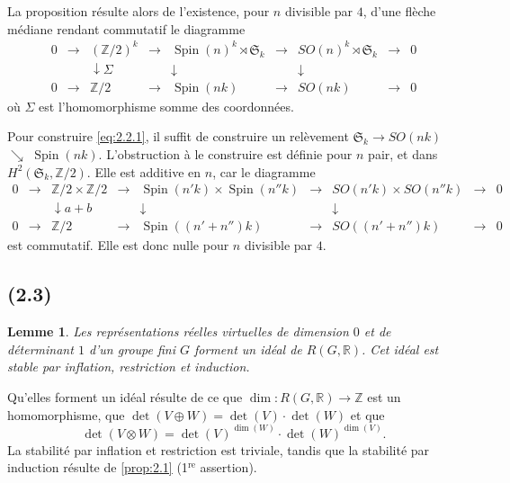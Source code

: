 \documentclass[11pt]{amsart}
\theoremstyle{plain}
\newtheorem{lemme}[theoreme]{Lemme}
\theoremstyle{definition}
\DeclareMathOperator{\Spin}{Spin}
\newcommand{\R}{\mathbb{R}}
\newcommand{\Z}{\mathbb{Z}}
\begin{document}
La proposition r\'esulte alors de l'existence, pour $n$ divisible par $4$, d'une fl\`eche m\'ediane rendant commutatif le diagramme
\begin{equation}\label{eq:2.2.1}
\begin{array}{ccccccccc}
0 & \longrightarrow & (\Z/2)^k & \longrightarrow & \Spin(n)^k\rtimes\mathfrak{S}_k & \longrightarrow & SO(n)^k\rtimes\mathfrak{S}_k & \longrightarrow & 0 \\
  &               & \downarrow{\scriptstyle\Sigma} & & \downarrow & & \downarrow & & \\
0 & \longrightarrow & \Z/2 & \longrightarrow & \Spin(nk) & \longrightarrow & SO(nk) & \longrightarrow & 0
\end{array}
\end{equation}
o\`u $\Sigma$ est l'homomorphisme somme des coordonn\'ees.

Pour construire \eqref{eq:2.2.1}, il suffit de construire un rel\`evement $\mathfrak{S}_k\to SO(nk)$ $\searrow$ $\Spin(nk)$. L'obstruction \`a le construire est d\'efinie pour $n$ pair, et dans $H^2(\mathfrak{S}_k,\Z/2)$. Elle est additive en $n$, car le diagramme
\[
\begin{array}{ccccccccc}
0 & \to & \Z/2\times\Z/2 & \to & \Spin(n'k)\times\Spin(n''k) & \to & SO(n'k)\times SO(n''k) & \to & 0 \\
  &     & \downarrow{a+b} & & \downarrow & & \downarrow & & \\
0 & \to & \Z/2 & \to & \Spin((n'+n'')k) & \to & SO((n'+n'')k) & \to & 0
\end{array}
\]
est commutatif. Elle est donc nulle pour $n$ divisible par $4$.

\subsection{(2.3)}
\begin{lemme}\label{lem:2.3}
Les repr\'esentations r\'eelles virtuelles de dimension $0$ et de d\'eterminant $1$ d'un groupe fini $G$ forment un id\'eal de $R(G,\R)$. Cet id\'eal est stable par inflation, restriction et induction.
\end{lemme}

Qu'elles forment un id\'eal r\'esulte de ce que $\dim\colon R(G,\R)\to\Z$ est un homomorphisme, que $\det(V\oplus W)=\det(V)\cdot\det(W)$ et que
\[
\det(V\otimes W)=\det(V)^{\dim(W)}\cdot\det(W)^{\dim(V)}.
\]
La stabilit\'e par inflation et restriction est triviale, tandis que la stabilit\'e par induction r\'esulte de \ref{prop:2.1} (1$^{\text{re}}$ assertion).
\end{document}
